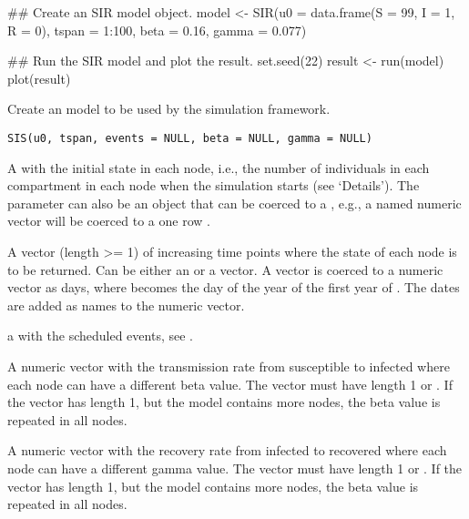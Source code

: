 \documentclass[letterpaper]{book}
\begin{document}
%
\begin{Examples}
\begin{ExampleCode}
## Create an SIR model object.
model <- SIR(u0 = data.frame(S = 99, I = 1, R = 0),
             tspan = 1:100,
             beta = 0.16,
             gamma = 0.077)

## Run the SIR model and plot the result.
set.seed(22)
result <- run(model)
plot(result)
\end{ExampleCode}
\end{Examples}
%
\begin{Description}
Create an  model to be used by the simulation
framework.
\end{Description}
%
\begin{Usage}
\begin{verbatim}
SIS(u0, tspan, events = NULL, beta = NULL, gamma = NULL)
\end{verbatim}
\end{Usage}
%
\begin{Arguments}
\begin{ldescription}
\item[\code{u0}] A  with the initial state in each node,
i.e., the number of individuals in each compartment in each
node when the simulation starts (see `Details'). The
parameter  can also be an object that can be coerced
to a , e.g., a named numeric vector will be
coerced to a one row .

\item[\code{tspan}] A vector (length >= 1) of increasing time points
where the state of each node is to be returned. Can be either
an  or a  vector. A 
vector is coerced to a numeric vector as days, where
 becomes the day of the year of the first year
of . The dates are added as names to the numeric
vector.

\item[\code{events}] a  with the scheduled events, see
.

\item[\code{beta}] A numeric vector with the transmission rate from
susceptible to infected where each node can have a different
beta value. The vector must have length 1 or .
If the vector has length 1, but the model contains more nodes,
the beta value is repeated in all nodes.

\item[\code{gamma}] A numeric vector with the recovery rate from infected
to recovered where each node can have a different gamma
value. The vector must have length 1 or . If
the vector has length 1, but the model contains more nodes,
the beta value is repeated in all nodes.
\end{ldescription}
\end{Arguments}
\end{document}

